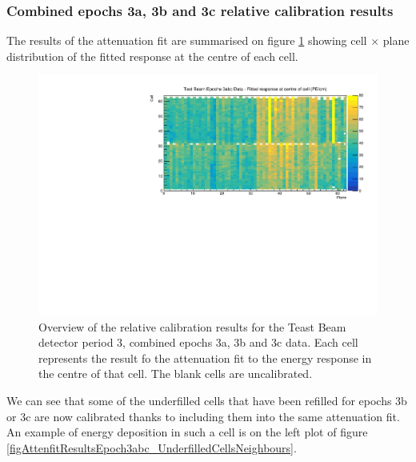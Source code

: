 \documentclass[12pt,a4paper]{article}
\begin{document}
\subsubsection*{Combined epochs 3a, 3b and 3c relative calibration results}

The results of the attenuation fit are summarised on figure \ref{figCellCentreResponseEp3abc} showing cell $\times$ plane distribution of the fitted response at the centre of each cell.

\begin{figure}[!hbtp]
\centering
\includegraphics[width=\textwidth]{Plots/CellResponseAtCentre_epoch3abc_Limited.pdf}
\caption{Overview of the relative calibration results for the Teast Beam detector period 3, combined epochs 3a, 3b and 3c data. Each cell represents the result fo the attenuation fit to the energy response in the centre of that cell. The blank cells are uncalibrated.}
\label{figCellCentreResponseEp3abc}
\end{figure}

We can see that some of the underfilled cells that have been refilled for epochs 3b or 3c are now calibrated thanks to including them into the same attenuation fit. An example of energy deposition in such a cell is on the left plot of figure \ref{figAttenfitResultsEpoch3abc_UnderfilledCellsNeighbours}.
\end{document}
